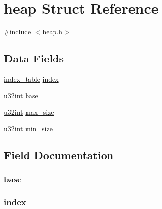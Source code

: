 \hypertarget{structheap}{}\section{heap Struct Reference}
\label{structheap}


{\ttfamily \#include $<$heap.\+h$>$}

\subsection*{Data Fields}
\begin{DoxyCompactItemize}
\item 
\hyperlink{structindex__table}{index\+\_\+table} \hyperlink{structheap_af44ecb378e6839e4c91808d259825274}{index}
\item 
\hyperlink{system_8h_a757de76cafbcddaac0d1632902fe4cb8}{u32int} \hyperlink{structheap_ab5763c2b18c825c8b8fba44b2e60ddc1}{base}
\item 
\hyperlink{system_8h_a757de76cafbcddaac0d1632902fe4cb8}{u32int} \hyperlink{structheap_aff98f60fdff673e586a88d147da4798c}{max\+\_\+size}
\item 
\hyperlink{system_8h_a757de76cafbcddaac0d1632902fe4cb8}{u32int} \hyperlink{structheap_af515ec763221e45adce632886c4cb888}{min\+\_\+size}
\end{DoxyCompactItemize}


\subsection{Field Documentation}
\hypertarget{structheap_ab5763c2b18c825c8b8fba44b2e60ddc1}{}
\subsubsection[{base}]{ base}\label{structheap_ab5763c2b18c825c8b8fba44b2e60ddc1}
\hypertarget{structheap_af44ecb378e6839e4c91808d259825274}{}
\subsubsection[{index}]{ index}\label{structheap_af44ecb378e6839e4c91808d259825274}
\hypertarget{structheap_aff98f60fdff673e586a88d147da4798c}{}
